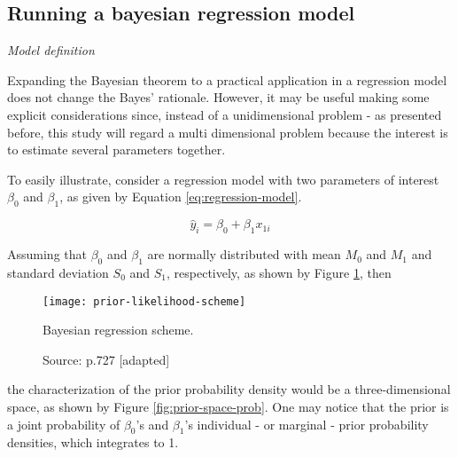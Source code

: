 
\subsection{Running a bayesian regression model}

\textit{Model definition}

Expanding the Bayesian theorem to a practical application in a regression model does not change the Bayes' rationale. However, it may be useful making some explicit considerations since, instead of a unidimensional problem - as presented before, this study will regard a multi dimensional problem because the interest is to estimate several parameters together.

To easily illustrate, consider a regression model with two parameters of interest $\beta_{0}$ and $\beta_{1}$, as given by Equation \ref{eq:regression-model}. 

 \begin{equation}
\label{eq:regression-model}
\hat{y}_{i} = \beta_{0} + \beta_{1}x_{1i}
\end{equation}

Assuming that $\beta_0$ and $\beta_1$ are normally distributed with mean $M_0$ and $M_1$ and standard deviation $S_0$ and $S_1$, respectively, as shown by Figure \ref{fig:prior-likelihood-scheme}, then
\begin{figure}[H]
\centering
\texttt{[image: prior-likelihood-scheme]}
\caption{Bayesian regression scheme.}
\label{fig:prior-likelihood-scheme}
\caption*{Source: \cite{kruschke2012} p.727 [adapted]}
\end{figure}

\noindent the characterization of the prior probability density would be a three-dimensional space, as shown by Figure \ref{fig:prior-space-prob}. One may notice that the prior is a joint probability of $\beta_0$'s and $\beta_1$'s individual - or marginal - prior probability densities, which integrates to 1.

